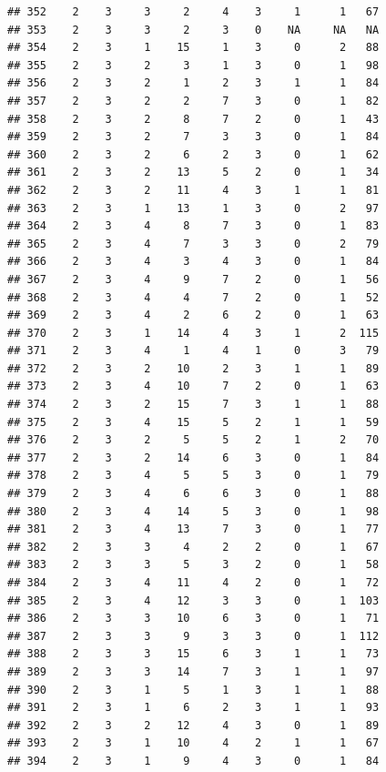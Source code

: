 \documentclass[krantz2,ChapterTOCs]{krantz}\usepackage{knitr}
\begin{document}
\begin{knitrout}
\begin{kframe}
\begin{verbatim}
## 352    2    3     3     2     4    3     1      1   67
## 353    2    3     3     2     3    0    NA     NA   NA
## 354    2    3     1    15     1    3     0      2   88
## 355    2    3     2     3     1    3     0      1   98
## 356    2    3     2     1     2    3     1      1   84
## 357    2    3     2     2     7    3     0      1   82
## 358    2    3     2     8     7    2     0      1   43
## 359    2    3     2     7     3    3     0      1   84
## 360    2    3     2     6     2    3     0      1   62
## 361    2    3     2    13     5    2     0      1   34
## 362    2    3     2    11     4    3     1      1   81
## 363    2    3     1    13     1    3     0      2   97
## 364    2    3     4     8     7    3     0      1   83
## 365    2    3     4     7     3    3     0      2   79
## 366    2    3     4     3     4    3     0      1   84
## 367    2    3     4     9     7    2     0      1   56
## 368    2    3     4     4     7    2     0      1   52
## 369    2    3     4     2     6    2     0      1   63
## 370    2    3     1    14     4    3     1      2  115
## 371    2    3     4     1     4    1     0      3   79
## 372    2    3     2    10     2    3     1      1   89
## 373    2    3     4    10     7    2     0      1   63
## 374    2    3     2    15     7    3     1      1   88
## 375    2    3     4    15     5    2     1      1   59
## 376    2    3     2     5     5    2     1      2   70
## 377    2    3     2    14     6    3     0      1   84
## 378    2    3     4     5     5    3     0      1   79
## 379    2    3     4     6     6    3     0      1   88
## 380    2    3     4    14     5    3     0      1   98
## 381    2    3     4    13     7    3     0      1   77
## 382    2    3     3     4     2    2     0      1   67
## 383    2    3     3     5     3    2     0      1   58
## 384    2    3     4    11     4    2     0      1   72
## 385    2    3     4    12     3    3     0      1  103
## 386    2    3     3    10     6    3     0      1   71
## 387    2    3     3     9     3    3     0      1  112
## 388    2    3     3    15     6    3     1      1   73
## 389    2    3     3    14     7    3     1      1   97
## 390    2    3     1     5     1    3     1      1   88
## 391    2    3     1     6     2    3     1      1   93
## 392    2    3     2    12     4    3     0      1   89
## 393    2    3     1    10     4    2     1      1   67
## 394    2    3     1     9     4    3     0      1   84
\end{verbatim}
\end{kframe}
\end{knitrout}
\end{document}
